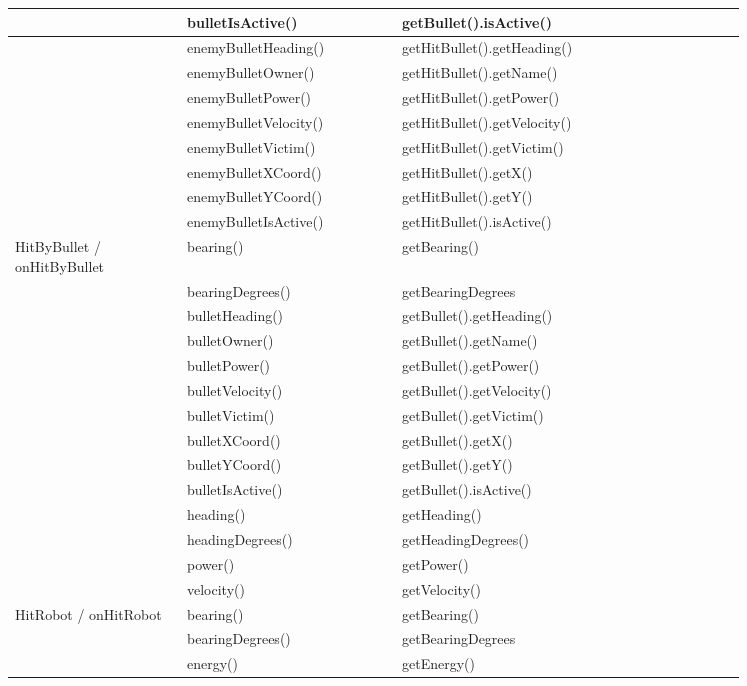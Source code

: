 \begin{center}
	\begin{tabular}{ | p{0.2\linewidth} | p{0.25\linewidth} | p{0.4\linewidth} |}
		\hline		
		& bulletIsActive() & getBullet().isActive() \\ \hline
		& enemyBulletHeading() & getHitBullet().getHeading() \\ \hline
		& enemyBulletOwner() & getHitBullet().getName() \\ \hline
		& enemyBulletPower() & getHitBullet().getPower() \\ \hline
		& enemyBulletVelocity() & getHitBullet().getVelocity() \\ \hline
		& enemyBulletVictim() & getHitBullet().getVictim() \\ \hline
		& enemyBulletXCoord() & getHitBullet().getX() \\ \hline
		& enemyBulletYCoord() & getHitBullet().getY() \\ \hline
		& enemyBulletIsActive() & getHitBullet().isActive() \\ \hline
		HitByBullet / onHitByBullet& bearing() & getBearing() \\ \hline
		& bearingDegrees() & getBearingDegrees \\ \hline
		& bulletHeading() & getBullet().getHeading() \\ \hline
		& bulletOwner() & getBullet().getName() \\ \hline
		& bulletPower() & getBullet().getPower() \\ \hline
		& bulletVelocity() & getBullet().getVelocity() \\ \hline
		& bulletVictim() & getBullet().getVictim() \\ \hline
		& bulletXCoord() & getBullet().getX() \\ \hline
		& bulletYCoord() & getBullet().getY() \\ \hline
		& bulletIsActive() & getBullet().isActive() \\ \hline
		& heading() & getHeading() \\ \hline
		& headingDegrees() & getHeadingDegrees() \\ \hline
		& power() & getPower() \\ \hline
		& velocity() & getVelocity() \\ \hline
		HitRobot / onHitRobot & bearing() & getBearing() \\ \hline
		& bearingDegrees() & getBearingDegrees \\ \hline
		& energy() & getEnergy() \\ \hline

\end{tabular}
\end{center}
